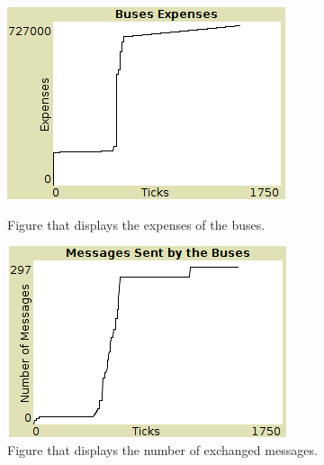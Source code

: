 \begin{figure}[htbp]
\centering
\begin{minipage}{.48\textwidth}
  \includegraphics[width=\textwidth]{src/expenses.png}
  \caption{\label{fig:expense}Figure that displays the expenses of the buses.}
\end{minipage}%
\begin{minipage}{.48\textwidth}
  \includegraphics[width=\textwidth]{src/nr_messages.png}
  \caption{\label{fig:messages}Figure that displays the number of exchanged messages.}
\end{minipage}
\end{figure}

